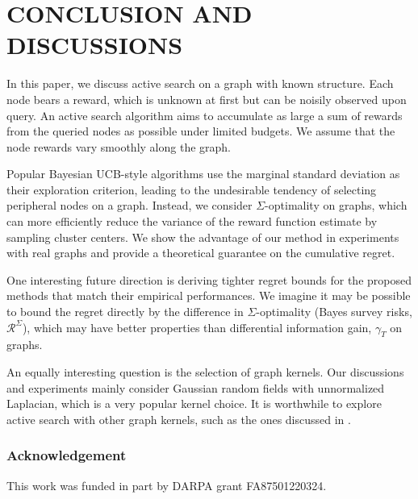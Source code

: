 \documentclass[]{article}
\begin{document}
\section{CONCLUSION AND DISCUSSIONS}
\label{sec:conclude}

In this paper, we discuss active search on a graph with known structure. Each node bears a reward, which is unknown at first but can be noisily observed upon query. 
An active search algorithm aims to accumulate as large a sum of rewards from the queried nodes as possible under limited budgets. 
We assume that the node rewards vary smoothly along the graph.

Popular Bayesian UCB-style algorithms \citep{srinivas2012information,vanchinathanadaptively,valko2014spectral}
use the marginal standard deviation as their exploration criterion, leading to the undesirable tendency
of selecting peripheral nodes on a graph. Instead, we consider 
$\Sigma$-optimality on graphs, which can more efficiently reduce the variance of the reward function estimate by 
sampling cluster centers. We show the advantage of our method in experiments with real graphs and 
provide a theoretical guarantee on the cumulative regret.


One interesting future direction is deriving tighter regret bounds for the proposed methods that match their empirical performances. 
We imagine it may be possible to bound the regret directly by the difference in $\Sigma$-optimality (Bayes survey risks, $\mathcal{R}^{\Sigma}$), which may have better properties than differential information gain, $\gamma_T$ on graphs.

An equally interesting question is the selection of graph kernels. Our discussions and experiments mainly consider Gaussian random fields with unnormalized Laplacian, which is a very popular kernel choice. 
It is worthwhile to 
explore active search with other graph kernels, such as the ones discussed in \cite{SmolaK03}.


\subsubsection*{Acknowledgement}
This work was funded in part by DARPA grant FA87501220324.

\appendix

%
% 

%

% 
%


\renewcommand\bibsection{\subsubsection*{References}}


\end{document}
